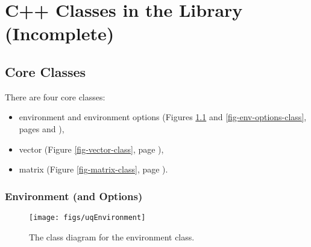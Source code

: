 \chapter{C++ Classes in the Library (Incomplete)}\label{ch-classes}
\thispagestyle{headings}



\section{Core Classes}

There are four core classes:
\begin{itemize}
\item environment and environment options (Figures \ref{fig-env-class} and \ref{fig-env-options-class}, pages \pageref{fig-env-class} and \pageref{fig-env-options-class}),
\item vector (Figure \ref{fig-vector-class}, page \pageref{fig-vector-class}),
\item matrix (Figure \ref{fig-matrix-class}, page \pageref{fig-matrix-class}).
\end{itemize}

\clearpage
\subsection{Environment (and Options)}

\begin{figure}[h!]
\begin{center}
\texttt{[image: figs/uqEnvironment]}
\end{center}
\caption{
The class diagram for the environment class.
}
\label{fig-env-class}
\end{figure}

